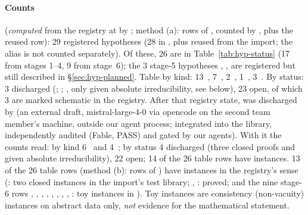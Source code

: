 \paragraph{Counts} (\emph{computed} from the registry at  by ; method (a): rows  of , counted by , plus the reused  row): 29 registered
hypotheses (28 in , plus  reused from the import; the alias
 is not counted separately). Of these, 26 are in Table~\ref{tab:hyp-status} (17 from stages
1--4, 9 from stage~6); the 3 stage-5 hypotheses , ,  are registered but still
described in \S\ref{sec:hyp-planned}. Table by kind: 13~\kindlit, 7~\kindinfra, 2~\kindoos, 1~\kindcond, 3~\kinddis. By status:
3 discharged (; ; , only given absolute irreducibility, see below), 23 open, of which 3
are marked schematic in the registry. After that registry state,  was discharged by
 (an external draft, mistral-large-4-0 via opencode on the second team member's
machine, outside our agent process; integrated into the library, independently audited (Fable, PASS) and gated by our agents). With it
the counts read: by kind 6~\kindinfra{} and 4~\kinddis; by status 4 discharged (three closed proofs and 
given absolute irreducibility), 22 open; 14 of the 26 table rows have instances. 13 of the 26 table rows (method (b): rows of ) have instances in the registry's sense (: two closed instances in the
import's test library; , : proved;  and the nine stage-6 rows ,
, , , , , , , : toy instances in ). Toy instances are consistency (non-vacuity) instances on abstract data
only, \emph{not} evidence for the mathematical statement.

